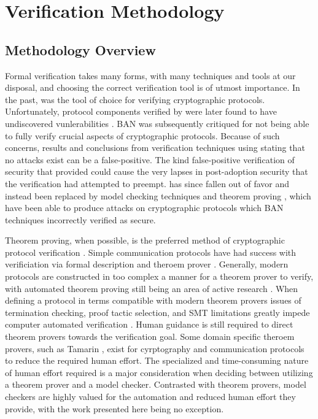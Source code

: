 \hypertarget{sec:methodology}{%
\chapter{Verification Methodology}\label{sec:methodology}}

\hypertarget{sec:methodology-overview}{%
\section{Methodology Overview}\label{sec:methodology-overview}}

Formal verification takes many forms, with many techniques and tools at our disposal, and choosing the correct verification tool is of utmost importance.
In the past,  \autocite{burrows1989logic} was the tool of choice for verifying cryptographic protocols.
Unfortunately, protocol components verified by  were later found to have undiscovered vunlerabilities \autocite{snekkenes1991exploring}.
BAN was subsequently critiqued \autocite{boyd1993limitation} for not being able to fully verify crucial aspects of cryptographic protocols.
Because of such concerns, results and conclusions from verification techniques using  stating that no attacks exist can be a false-positive.
The kind false-positive verification of security that  provided could cause the very lapses in post-adoption security that the verification had attempted to preempt.
 has since fallen out of favor and instead been replaced by model checking techniques \autocite{holzmann1991design} and theorem proving \autocite{andrews1980axiomatic}, which have been able to produce attacks on cryptographic protocols which BAN techniques incorrectly verified as secure.

Theorem proving, when possible, is the preferred method of cryptographic protocol verification \autocite{kobeissi2020verifpal}.
Simple communication protocols have had success with verificiation via formal description and theroem prover \autocite{berry1987towards, cheng1990formal}.
Generally, modern protocols are constructed in too complex a manner for a theorem prover to verify, with automated theorem proving still being an area of active research \autocite{xiong2020smartverif, bhargavan2021text}.
When defining a protocol in terms compatible with modern theorem provers issues of termination checking, proof tactic selection, and SMT limitations greatly impede computer automated verification \autocite{hassan2021automated}.
Human guidance is still required to direct theorem provers towards the verification goal.
Some domain specific theroem provers, such as Tamarin \autocite{basin2017symbolically}, exist for cyrptography and communication protocols to reduce the required human effort.
The specialized and time-consuming nature of human effort required is a major consideration when deciding between utilizing a theorem prover and a model checker.
Contrasted with theorem provers, model checkers are highly valued for the automation and reduced human effort they provide, with the work presented here being no exception.

